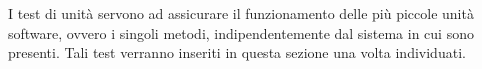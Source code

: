 I test di unità servono ad assicurare il funzionamento delle più piccole unità software, ovvero i singoli metodi, indipendentemente dal sistema in cui sono presenti.
\newline
Tali test verranno inseriti in questa sezione una volta individuati.